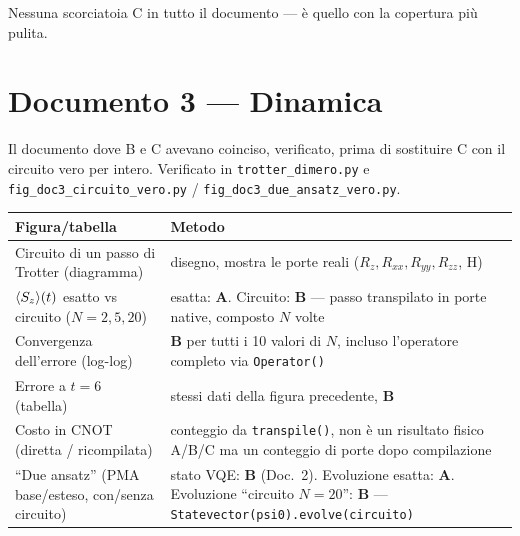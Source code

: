 \documentclass[11pt,a4paper]{article}
\begin{document}
Nessuna scorciatoia C in tutto il documento --- è quello con la copertura più
pulita.

\section{Documento 3 --- Dinamica}

Il documento dove B e C avevano coinciso, verificato, prima di sostituire C
con il circuito vero per intero. Verificato in \texttt{trotter\_dimero.py}
e \texttt{fig\_doc3\_circuito\_vero.py} / \texttt{fig\_doc3\_due\_ansatz\_vero.py}.

\begin{center}
\renewcommand{\arraystretch}{1.3}
\begin{tabular}{@{}p{}p{}@{}}
\toprule
\rowcolor{grigetto}
\textbf{Figura/tabella} & \textbf{Metodo} \\
\midrule
Circuito di un passo di Trotter (diagramma) & disegno, mostra le porte reali
($R_z,R_{xx},R_{yy},R_{zz}$, H) \\
$\langle S_z \rangle(t)$ esatto vs circuito ($N{=}2,5,20$) & esatta: \textbf{A}.
Circuito: \textbf{B} --- passo transpilato in porte native, composto $N$
volte \\
Convergenza dell'errore (log-log) & \textbf{B} per tutti i 10 valori di $N$,
incluso l'operatore completo via \texttt{Operator()} \\
Errore a $t=6$ (tabella) & stessi dati della figura precedente, \textbf{B} \\
Costo in CNOT (diretta / ricompilata) & conteggio da \texttt{transpile()}, non
è un risultato fisico A/B/C ma un conteggio di porte dopo compilazione \\
``Due ansatz'' (PMA base/esteso, con/senza circuito) & stato VQE: \textbf{B}
(Doc.\ 2). Evoluzione esatta: \textbf{A}. Evoluzione ``circuito $N{=}20$'':
\textbf{B} --- \texttt{Statevector(psi0).evolve(circuito)} \\
\bottomrule
\end{tabular}
\end{center}

\end{document}
